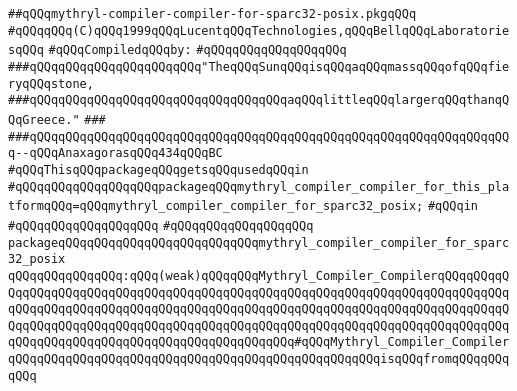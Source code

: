 \label{src/lib/core/mythryl-compiler-compiler/mythryl-compiler-compiler-for-sparc32-posix.pkg}
\verb|##qQQqmythryl-compiler-compiler-for-sparc32-posix.pkgqQQq|\newline
\verb|#qQQqqQQq(C)qQQq1999qQQqLucentqQQqTechnologies,qQQqBellqQQqLaboratoriesqQQq|\newline
\newline
\verb|#qQQqCompiledqQQqby:|\newline
\verb|#qQQqqQQqqQQqqQQqqQQq|\newline
\newline
\newline
\newline
\verb|###qQQqqQQqqQQqqQQqqQQqqQQq"TheqQQqSunqQQqisqQQqaqQQqmassqQQqofqQQqfieryqQQqstone,|\newline
\verb|###qQQqqQQqqQQqqQQqqQQqqQQqqQQqqQQqqQQqaqQQqlittleqQQqlargerqQQqthanqQQqGreece."|\newline
\verb|###|\newline
\verb|###qQQqqQQqqQQqqQQqqQQqqQQqqQQqqQQqqQQqqQQqqQQqqQQqqQQqqQQqqQQqqQQqqQQq--qQQqAnaxagorasqQQq434qQQqBC|\newline
\newline
\newline
\verb|#qQQqThisqQQqpackageqQQqgetsqQQqusedqQQqin|\newline
\verb|#qQQqqQQqqQQqqQQqqQQqpackageqQQqmythryl_compiler_compiler_for_this_platformqQQq=qQQqmythryl_compiler_compiler_for_sparc32_posix;|\newline
\verb|#qQQqin|\newline
\verb|#qQQqqQQqqQQqqQQqqQQq|\newline
\verb|#qQQqqQQqqQQqqQQqqQQq|\newline
\verb|packageqQQqqQQqqQQqqQQqqQQqqQQqqQQqmythryl_compiler_compiler_for_sparc32_posix|\newline
\verb|qQQqqQQqqQQqqQQq:qQQq(weak)qQQqqQQqMythryl_Compiler_CompilerqQQqqQQqqQQqqQQqqQQqqQQqqQQqqQQqqQQqqQQqqQQqqQQqqQQqqQQqqQQqqQQqqQQqqQQqqQQqqQQqqQQqqQQqqQQqqQQqqQQqqQQqqQQqqQQqqQQqqQQqqQQqqQQqqQQqqQQqqQQqqQQqqQQqqQQqqQQqqQQqqQQqqQQqqQQqqQQqqQQqqQQqqQQqqQQqqQQqqQQqqQQqqQQqqQQqqQQqqQQqqQQqqQQqqQQqqQQqqQQqqQQqqQQqqQQqqQQqqQQq#qQQqMythryl_Compiler_CompilerqQQqqQQqqQQqqQQqqQQqqQQqqQQqqQQqqQQqqQQqqQQqqQQqqQQqisqQQqfromqQQqqQQqqQQq|\newline
